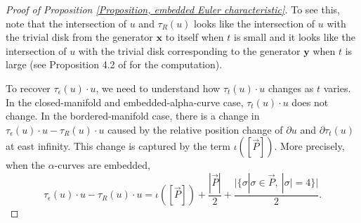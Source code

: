 \documentclass{amsart}
\theoremstyle{definition}
\theoremstyle{remark}
\numberwithin{equation}{section}
\numberwithin{equation}{section} \makeatletter
\begin{document}
\begin{proof}[Proof of Proposition \ref{Proposition, embedded Euler characteristic}]
To see this, note that the intersection of $u$ and $\tau_R(u)$ looks like the intersection of $u$ with the trivial disk from the generator $\bm{x}$ to itself when $t$ is small and it looks like the intersection of $u$ with the trivial disk corresponding to the generator $\bm{y}$ when $t$ is large (see Proposition 4.2 of \cite{MR2240908} for the computation).


To recover $\tau_\epsilon(u)\cdot u$, we need to understand how $\tau_t(u)\cdot u$ changes as $t$ varies. In the closed-manifold and embedded-alpha-curve case, $\tau_t(u)\cdot u$ does not change. In the bordered-manifold case, there is a change in $\tau_\epsilon(u)\cdot u-\tau_R(u)\cdot u$ caused by the relative position change of $\partial u$ and $\partial \tau_t(u)$ at east infinity. This change is captured by the term $\iota([\overrightarrow{P}])$. More precisely, when the $\alpha$-curves are embedded, $$\tau_\epsilon(u)\cdot u-\tau_R(u)\cdot u=\iota([\overrightarrow{P}])+\frac{|\overrightarrow{P}|}{2}+\frac{\vert\{\sigma|{\sigma}\in \overrightarrow{P},\ |\sigma|=4\}\vert}{2}.$$ 


\end{proof}
\end{document}
